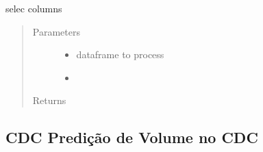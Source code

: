 \documentclass[letterpaper,10pt,english]{sphinxmanual}
\begin{document}
\begin{fulllineitems}
\label{\detokenize{algorithms:algorithms.idp.idp_utils.select_columns}}
\sphinxAtStartPar
selec columns
\begin{quote}\begin{description}
\item[{Parameters}] \leavevmode\begin{itemize}
\item {} 
\sphinxAtStartPar
{} \textendash{} dataframe to process

\item {} 
\sphinxAtStartPar
{} \textendash{} 

\end{itemize}

\item[{Returns}] \leavevmode
\sphinxAtStartPar


\end{description}\end{quote}

\end{fulllineitems}



\subsection{CDC \sphinxhyphen{} Predição de Volume no CDC}
\label{\detokenize{algorithms:cdc-predicao-de-volume-no-cdc}}
\sphinxAtStartPar
{}

\label{\detokenize{algorithms:module-algorithms.cdc.cdc_trainer}}
\end{document}
